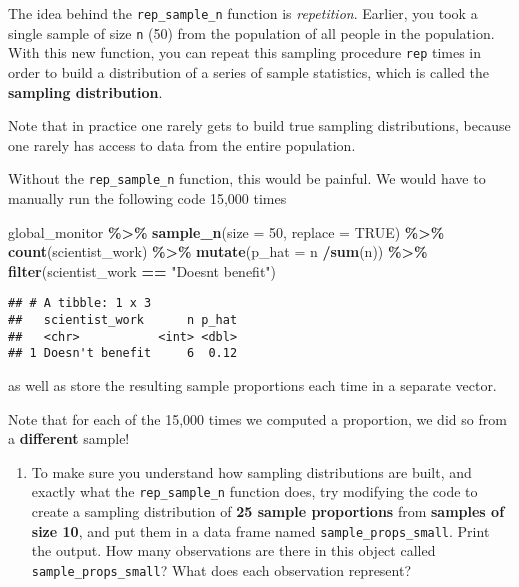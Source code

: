 \documentclass[
]{article}
\newenvironment{Shaded}{\begin{snugshade}}{\end{snugshade}}
\newcommand{\AttributeTok}[1]{\textcolor[rgb]{0.13,0.29,0.53}{#1}}
\newcommand{\ConstantTok}[1]{\textcolor[rgb]{0.56,0.35,0.01}{#1}}
\newcommand{\DecValTok}[1]{\textcolor[rgb]{0.00,0.00,0.81}{#1}}
\newcommand{\FunctionTok}[1]{\textcolor[rgb]{0.13,0.29,0.53}{\textbf{#1}}}
\newcommand{\NormalTok}[1]{#1}
\newcommand{\SpecialCharTok}[1]{\textcolor[rgb]{0.81,0.36,0.00}{\textbf{#1}}}
\newcommand{\StringTok}[1]{\textcolor[rgb]{0.31,0.60,0.02}{#1}}
\providecommand{\tightlist}{%
  \setlength{\itemsep}{0pt}\setlength{\parskip}{0pt}}
\begin{document}
The idea behind the \texttt{rep\_sample\_n} function is
\emph{repetition}. Earlier, you took a single sample of size \texttt{n}
(50) from the population of all people in the population. With this new
function, you can repeat this sampling procedure \texttt{rep} times in
order to build a distribution of a series of sample statistics, which is
called the \textbf{sampling distribution}.

Note that in practice one rarely gets to build true sampling
distributions, because one rarely has access to data from the entire
population.

Without the \texttt{rep\_sample\_n} function, this would be painful. We
would have to manually run the following code 15,000 times

\begin{Shaded}
\begin{Highlighting}[]
\NormalTok{global\_monitor }\SpecialCharTok{\%\textgreater{}\%}
  \FunctionTok{sample\_n}\NormalTok{(}\AttributeTok{size =} \DecValTok{50}\NormalTok{, }\AttributeTok{replace =} \ConstantTok{TRUE}\NormalTok{) }\SpecialCharTok{\%\textgreater{}\%}
  \FunctionTok{count}\NormalTok{(scientist\_work) }\SpecialCharTok{\%\textgreater{}\%}
  \FunctionTok{mutate}\NormalTok{(}\AttributeTok{p\_hat =}\NormalTok{ n }\SpecialCharTok{/}\FunctionTok{sum}\NormalTok{(n)) }\SpecialCharTok{\%\textgreater{}\%}
  \FunctionTok{filter}\NormalTok{(scientist\_work }\SpecialCharTok{==} \StringTok{"Doesn\textquotesingle{}t benefit"}\NormalTok{)}
\end{Highlighting}
\end{Shaded}

\begin{verbatim}
## # A tibble: 1 x 3
##   scientist_work      n p_hat
##   <chr>           <int> <dbl>
## 1 Doesn't benefit     6  0.12
\end{verbatim}

as well as store the resulting sample proportions each time in a
separate vector.

Note that for each of the 15,000 times we computed a proportion, we did
so from a \textbf{different} sample!

\begin{enumerate}
\def\labelenumi{\arabic{enumi}.}
\setcounter{enumi}{4}
\tightlist
\item
  To make sure you understand how sampling distributions are built, and
  exactly what the \texttt{rep\_sample\_n} function does, try modifying
  the code to create a sampling distribution of \textbf{25 sample
  proportions} from \textbf{samples of size 10}, and put them in a data
  frame named \texttt{sample\_props\_small}. Print the output. How many
  observations are there in this object called
  \texttt{sample\_props\_small}? What does each observation represent?
\end{enumerate}
\end{document}
